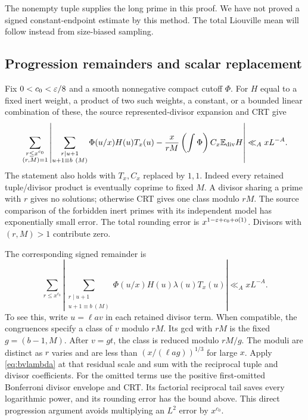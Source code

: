 The nonempty tuple supplies the long prime in this proof. We have
not proved a signed constant-endpoint estimate by this method.
The total Liouville mean will follow instead from size-biased sampling.

\subsection{Progression remainders and scalar replacement}

Fix $0<c_0<\varepsilon/8$ and a smooth nonnegative compact cutoff $\Phi$.
For $H$ equal to a fixed inert weight, a product of two such weights,
a constant, or a bounded linear combination of these, the source
represented-divisor expansion and CRT give
\begin{align}\label{eq:unsigned-progression}
 \sum_{\substack{r\leq x^{c_0}\\(r,M)=1}}
 \left|\sum_{\substack{r\mid u+1\\u+1\equiv b\ (M)}}
 \Phi(u/x)H(u)T_x(u)
 -\frac{x}{rM}\left(\int\Phi\right)C_x\mathbb E_{\rm div}H\right|
 \ll_A xL^{-A}.
\end{align}
The statement also holds with $T_x,C_x$ replaced by $1,1$.
Indeed every retained tuple/divisor product is eventually coprime
to fixed $M$. A divisor sharing a prime with $r$ gives no solutions;
otherwise CRT gives one class modulo $rM$. The source comparison of
the forbidden inert primes with its independent model has exponentially
small error. The total rounding error is
$x^{1-\varepsilon+c_0+o(1)}$. Divisors with $(r,M)>1$ contribute zero.

The corresponding signed remainder is
\begin{equation}\label{eq:signed-progression}
 \sum_{r\leq x^{c_0}}
 \left|\sum_{\substack{r\mid u+1\\u+1\equiv b\ (M)}}
    \Phi(u/x)H(u)\lambda(u)T_x(u)\right|
 \ll_A xL^{-A}.
\end{equation}
To see this, write $u=\ell av$ in each retained divisor term.
When compatible, the congruences specify a class of $v$ modulo $rM$.
Its gcd with $rM$ is the fixed $g=(b-1,M)$. After $v=gt$, the
class is reduced modulo $rM/g$. The moduli are distinct as $r$ varies
and are less than $(x/(\ell ag))^{1/3}$ for large $x$.
Apply \eqref{eq:bvlambda} at that residual scale and sum with the
reciprocal tuple and divisor coefficients. For the omitted terms use
the positive first-omitted Bonferroni divisor envelope and CRT. Its
factorial reciprocal tail saves every logarithmic power, and its
rounding error has the bound above. This direct progression argument
avoids multiplying an $L^2$ error by $x^{c_0}$.

